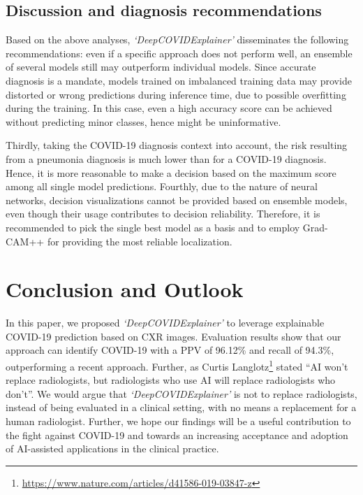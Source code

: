 \documentclass[conference]{IEEEtran}
\begin{document}
\subsection{Discussion and diagnosis recommendations}
Based on the above analyses, \emph{`DeepCOVIDExplainer'} disseminates the following recommendations: even if a specific approach does not perform well, an ensemble of several models still may outperform individual models. Since accurate diagnosis is a mandate, models trained on imbalanced training data may provide distorted or wrong predictions during inference time, due to possible overfitting during the training. In this case, even a high accuracy score can be achieved without predicting minor classes, hence might be uninformative. 

Thirdly, taking the COVID-19 diagnosis context into account, the risk resulting from a pneumonia diagnosis is much lower than for a COVID-19 diagnosis. Hence, it is more reasonable to make a decision based on the maximum score among all single model predictions. Fourthly, due to the nature of neural networks, decision visualizations cannot be provided based on ensemble models, even though their usage contributes to decision reliability. Therefore, it is recommended to pick the single best model as a basis and to employ Grad-CAM++ for providing the most reliable localization. 


\section{Conclusion and Outlook}
\label{sec:co}
In this paper, we proposed \emph{`DeepCOVIDExplainer'} to leverage explainable COVID-19 prediction based on CXR images. Evaluation results show that our approach can identify COVID-19 with a PPV of 96.12\% and recall of 94.3\%, outperforming a recent approach. Further, as Curtis Langlotz\footnote{\url{https://www.nature.com/articles/d41586-019-03847-z}} stated ``AI won't replace radiologists, but radiologists who use AI will replace radiologists who don't''.  
We would argue that \emph{`DeepCOVIDExplainer'} is not to replace radiologists, instead of being evaluated in a clinical setting, with no means a replacement for a human radiologist. 
Further, we hope our findings will be a useful contribution to the fight against COVID-19 and towards an increasing acceptance and adoption of AI-assisted applications in the clinical practice. 
\end{document}
